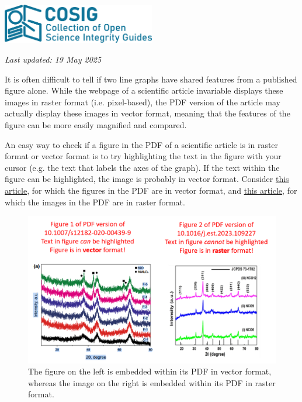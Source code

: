 \documentclass[letterpaper, 12pt]{article}
\begin{document}
\flushleft\includegraphics[width=0.5\textwidth]{img/home/241017_final_logo_mockup.png}

\textit{Last updated: 19 May 2025}

It is often difficult to tell if two line graphs have shared features from a published figure alone. While the webpage of a scientific article invariable displays these images in raster format (i.e. pixel-based), the PDF version of the article may actually display these images in vector format, meaning that the features of the figure can be more easily magnified and compared.

An easy way to check if a figure in the PDF of a scientific article is in raster format or vector format is to try highlighting the text in the figure with your cursor (e.g. the text that labels the axes of the graph). If the text within the figure can be highlighted, the image is probably in vector format. Consider \href{https://doi.org/10.1007/s12182-020-00439-9}{this article}, for which the figures in the PDF are in vector format, and \href{https://doi.org/10.1016/j.est.2023.109227}{this article}, for which the images in the PDF are in raster format.

\begin{figure}[h!tbp]
    \includegraphics[width=\textwidth]{img/vector/vector_vs_raster.png}
    \caption*{ The figure on the left is embedded within its PDF in vector format, whereas the image on the right is embedded within its PDF in raster format.}
\end{figure}
\end{document}
